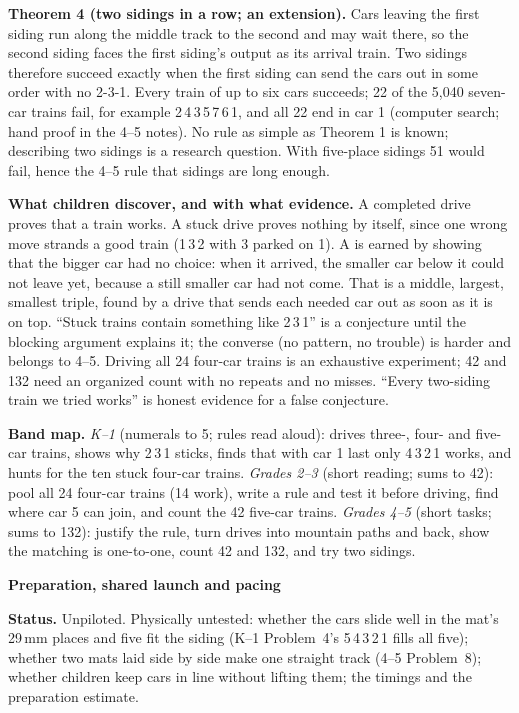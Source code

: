 \documentclass[11pt]{article}
\newcommand{\head}[1]{\par\needspace{5\baselineskip}\textbf{\large #1}\par\nopagebreak}
\newcommand{\tr}[1]{\mbox{#1}}
\begin{document}
\textbf{Theorem 4 (two sidings in a row; an extension).} Cars leaving the first siding run along the middle track to the second and may wait there, so the second siding faces the first siding's output as its arrival train. Two sidings therefore succeed exactly when the first siding can send the cars out in some order with no 2-3-1. Every train of up to six cars succeeds; 22 of the 5{,}040 seven-car trains fail, for example \tr{2\,4\,3\,5\,7\,6\,1}, and all 22 end in car 1 (computer search; hand proof in the 4--5 notes). No rule as simple as Theorem 1 is known; describing two sidings is a research question. With five-place sidings 51 would fail, hence the 4--5 rule that sidings are long enough.

\textbf{What children discover, and with what evidence.} A completed drive proves that a train works. A stuck drive proves nothing by itself, since one wrong move strands a good train (\tr{1\,3\,2} with 3 parked on 1). A \no{} is earned by showing that the bigger car had no choice: when it arrived, the smaller car below it could not leave yet, because a still smaller car had not come. That is a middle, largest, smallest triple, found by a drive that sends each needed car out as soon as it is on top. ``Stuck trains contain something like 2\,3\,1'' is a conjecture until the blocking argument explains it; the converse (no pattern, no trouble) is harder and belongs to 4--5. Driving all 24 four-car trains is an exhaustive experiment; 42 and 132 need an organized count with no repeats and no misses. ``Every two-siding train we tried works'' is honest evidence for a false conjecture.

\textbf{Band map.} \emph{K--1} (numerals to 5; rules read aloud): drives three-, four- and five-car trains, shows why \tr{2\,3\,1} sticks, finds that with car 1 last only \tr{4\,3\,2\,1} works, and hunts for the ten stuck four-car trains. \emph{Grades 2--3} (short reading; sums to 42): pool all 24 four-car trains (14 work), write a rule and test it before driving, find where car 5 can join, and count the 42 five-car trains. \emph{Grades 4--5} (short tasks; sums to 132): justify the rule, turn drives into mountain paths and back, show the matching is one-to-one, count 42 and 132, and try two sidings.

\newpage
\head{Preparation, shared launch and pacing}
\textbf{Status.} Unpiloted. Physically untested: whether the cars slide well in the mat's 29\,mm places and five fit the siding (K--1 Problem~4's \tr{5\,4\,3\,2\,1} fills all five); whether two mats laid side by side make one straight track (4--5 Problem~8); whether children keep cars in line without lifting them; the timings and the preparation estimate.
\end{document}

